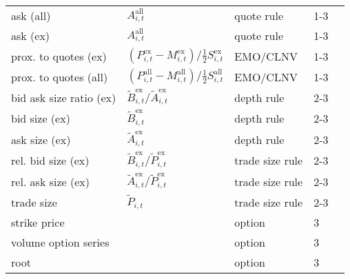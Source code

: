\begin{threeparttable}
\begin{tabular}{@{}lllll@{}}
        ask (all)               & $A_{i, t}^{\text{all}}$                                                                          & quote rule           & 1-3         \\
        ask (ex)                & $A_{i, t}^{\text{all}}$                                                                          & quote rule           & 1-3         \\
        prox. to quotes (ex)    & $\left(P_{i, t}^{\text{ex}}- M_{i, t}^{\text{ex}}\right) / \tfrac{1}{2} S_{i, t}^{\text{ex}}$    & \gls{EMO}/\gls{CLNV} & 1-3         \\
        prox. to quotes (all)   & $\left(P_{i, t}^{\text{all}}- M_{i, t}^{\text{all}}\right) / \tfrac{1}{2} S_{i, t}^{\text{all}}$ & \gls{EMO}/\gls{CLNV} & 1-3         \\
        bid ask size ratio (ex) & $\tilde{B}_{i, t}^{\text{ex}}/\tilde{A}_{i, t}^{\text{ex}}$                                      & depth rule           & 2-3         \\
        bid size (ex)           & $\tilde{B}_{i, t}^{\text{ex}}$                                                                   & depth rule           & 2-3         \\
        ask size (ex)           & $\tilde{A}_{i, t}^{\text{ex}}$                                                                   & depth rule           & 2-3         \\
        rel. bid size (ex)      & $\tilde{B}_{i, t}^{\text{ex}}/\tilde{P}_{i, t}^{\text{ex}}$                                      & trade size rule      & 2-3         \\
        rel. ask size (ex)      & $\tilde{A}_{i, t}^{\text{ex}}/\tilde{P}_{i, t}^{\text{ex}}$                                      & trade size rule      & 2-3         \\
        trade size              & $\tilde{P}_{i, t}$                                                                               & trade size rule      & 2-3         \\
        strike price            &                                                                                                  & option               & 3           \\
        volume option series    &                                                                                                  & option               & 3           \\
        root                    &                                                                                                  & option               & 3           \\

\end{tabular}
\end{threeparttable}
